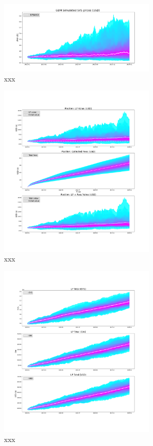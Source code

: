 \documentclass[journal,twocolumn,12pt]{ieeesyscoin}
\begin{document}
\lipsum[1]


\begin{figure}[h!]
\includegraphics[width=3in]{img/price_simulations.png}
\caption{xxx} 
\label{fig:daosys_protocol}
\end{figure}


\begin{figure}[h!]
\includegraphics[width=3in]{img/lp_position_values.png}
\caption{xxx} 
\label{fig:daosys_protocol}
\end{figure}


\begin{figure}[h!]
\includegraphics[width=3in]{img/lp_simulation.png}
\caption{xxx} 
\label{fig:daosys_protocol}
\end{figure}
\end{document}
